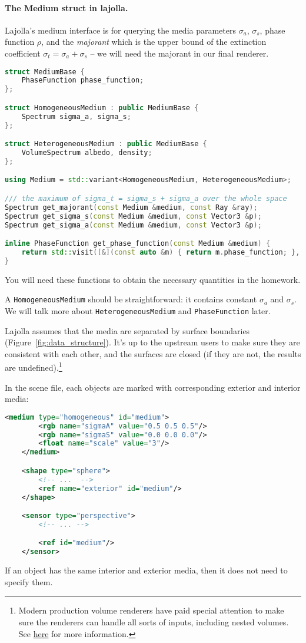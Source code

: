 \paragraph{The Medium struct in lajolla.} Lajolla's medium interface is for querying the media parameters $\sigma_a$, $\sigma_s$, phase function $\rho$, and the \emph{majorant} which is the upper bound of the extinction coefficient $\sigma_t = \sigma_a + \sigma_s$ -- we will need the majorant in our final renderer. 
\begin{lstlisting}[language=c++]
struct MediumBase {
    PhaseFunction phase_function;
};

struct HomogeneousMedium : public MediumBase {
    Spectrum sigma_a, sigma_s;
};

struct HeterogeneousMedium : public MediumBase {
    VolumeSpectrum albedo, density;
};

using Medium = std::variant<HomogeneousMedium, HeterogeneousMedium>;

/// the maximum of sigma_t = sigma_s + sigma_a over the whole space
Spectrum get_majorant(const Medium &medium, const Ray &ray);
Spectrum get_sigma_s(const Medium &medium, const Vector3 &p);
Spectrum get_sigma_a(const Medium &medium, const Vector3 &p);

inline PhaseFunction get_phase_function(const Medium &medium) {
    return std::visit([&](const auto &m) { return m.phase_function; }, medium);
}
\end{lstlisting}
You will need these functions to obtain the necessary quantities in the homework.

A \lstinline{HomogeneousMedium} should be straightforward: it contains constant $\sigma_a$ and $\sigma_s$.
We will talk more about \lstinline{HeterogeneousMedium} and \lstinline{PhaseFunction} later.

Lajolla assumes that the media are separated by surface boundaries (Figure~\ref{fig:data_structure}). It's up to the upstream users to make sure they are consistent with each other, and the surfaces are closed (if they are not, the results are undefined).\footnote{Modern production volume renderers have paid special attention to make sure the renderers can handle all sorts of inputs, including nested volumes. See \href{https://graphics.pixar.com/library/ProductionVolumeRendering/index.html}{here} for more information.}

In the scene file, each objects are marked with corresponding exterior and interior media:
\begin{lstlisting}[language=xml]
    <medium type="homogeneous" id="medium">
        <rgb name="sigmaA" value="0.5 0.5 0.5"/>
        <rgb name="sigmaS" value="0.0 0.0 0.0"/>
        <float name="scale" value="3"/>
    </medium>

    <shape type="sphere">
        <!-- ...  -->
        <ref name="exterior" id="medium"/>
    </shape>

    <sensor type="perspective">
        <!-- ... -->

        <ref id="medium"/>
    </sensor>
\end{lstlisting}
If an object has the same interior and exterior media, then it does not need to specify them. 


